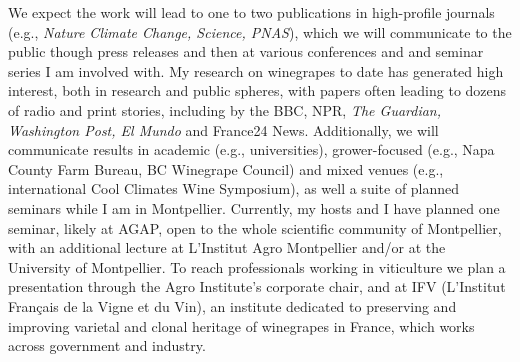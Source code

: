 \documentclass[11pt,letter,oneside]{article}
\begin{document}
We expect the work will lead to one to two publications in high-profile journals (e.g., \emph{Nature Climate Change, Science, PNAS}), which we will communicate to the public though press releases and then at various conferences and and seminar series I am involved with. My research on winegrapes to date has generated high interest, both in research and public spheres, with papers often leading to dozens of radio and print stories, including by the BBC, NPR, \emph{The Guardian, Washington Post, El Mundo} and France24 News. Additionally, we will communicate results in academic (e.g., universities), grower-focused (e.g., Napa County Farm Bureau, BC Winegrape Council) and mixed venues (e.g., international Cool Climates Wine Symposium), as well a suite of planned seminars while I am in Montpellier. Currently, my hosts and I have planned one seminar, likely at AGAP, open to the whole scientific community of Montpellier, with an additional lecture at L'Institut Agro Montpellier and/or at the University of Montpellier. To reach professionals working in viticulture we plan a presentation through the Agro Institute’s corporate chair, and at IFV  (L'Institut Français de la Vigne et du Vin), an institute dedicated to preserving and improving varietal and clonal heritage of winegrapes in France, which works across government and industry. 
\end{document}

